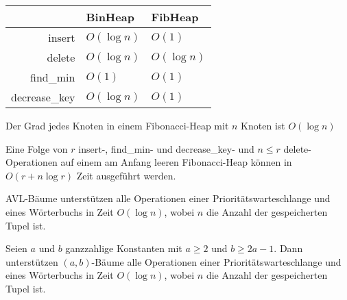 \documentclass{cheat-sheet}
\begin{document}




\begin{center}
  \begin{tabular}{r | l l}
    & BinHeap & FibHeap \\ \hline
    insert & $O(\log n)$ & $O(1)$ \\
    delete & $O(\log n)$ & $O(\log n)$ \\
    find_min & $O(1)$ & $O(1)$ \\
    decrease_key & $O(\log n)$ & $O(1)$ \\
  \end{tabular}
\end{center}


\begin{satz}
  Der Grad jedes Knoten in einem Fibonacci-Heap mit $n$ Knoten ist $O(\log n)$
\end{satz}

\begin{satz}
  Eine Folge von $r$ insert-, find_min- und decrease_key- und $n \leq r$ delete-Operationen auf einem am Anfang leeren Fibonacci-Heap können in $O(r + n \log r)$ Zeit ausgeführt werden.
\end{satz}




\begin{satz}
  AVL-Bäume unterstützen alle Operationen einer Prioritätswarteschlange und eines Wörterbuchs in Zeit $O(\log n)$, wobei $n$ die Anzahl der gespeicherten Tupel ist.
\end{satz}

\begin{satz}
  Seien $a$ und $b$ ganzzahlige Konstanten mit $a \geq 2$ und $b \geq 2 a - 1$. Dann unterstützen $(a, b)$-Bäume alle Operationen einer Prioritätswarteschlange und eines Wörterbuchs in Zeit $O(\log n)$, wobei $n$ die Anzahl der gespeicherten Tupel ist.
\end{satz}
\end{document}

